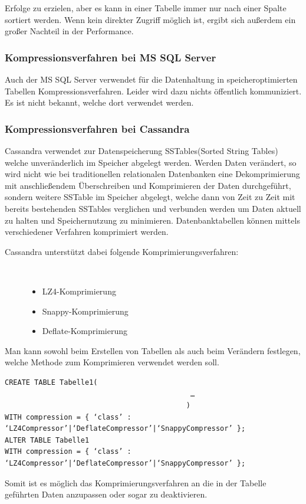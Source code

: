 \documentclass[a4paper, 12pt]{scrartcl}
\begin{document}
Erfolge zu erzielen, aber es kann in einer Tabelle immer nur nach einer Spalte sortiert werden. Wenn kein direkter Zugriff möglich ist, ergibt sich außerdem ein großer Nachteil in der Performance.
\newpage
\subsubsection{Kompressionsverfahren bei MS SQL Server}
Auch der MS SQL Server verwendet für die Datenhaltung in speicheroptimierten Tabellen Kompressionsverfahren. Leider wird dazu nichts öffentlich kommuniziert. Es ist nicht bekannt, welche dort verwendet werden. 
\subsubsection{Kompressionsverfahren bei Cassandra}
Cassandra verwendet zur Datenspeicherung SSTables(Sorted String Tables) welche unveränderlich im Speicher abgelegt werden. Werden Daten verändert, so wird nicht wie bei traditionellen relationalen Datenbanken eine Dekomprimierung mit anschließendem Überschreiben und Komprimieren der Daten durchgeführt, sondern weitere SSTable im Speicher abgelegt, welche dann von Zeit zu Zeit mit bereits bestehenden SSTables verglichen und verbunden werden um Daten aktuell zu halten und Speichernutzung zu minimieren.
Datenbanktabellen können mittels verschiedener Verfahren komprimiert werden. 
\begin{description}
	\item[Cassandra unterstützt dabei folgende Komprimierungsverfahren:]~\par
	\begin{itemize}
		\item LZ4-Komprimierung
		\item Snappy-Komprimierung
		\item Deflate-Komprimierung
	\end{itemize}
\end{description}
Man kann sowohl beim Erstellen von Tabellen als auch beim Verändern festlegen, welche Methode zum Komprimieren verwendet werden soll.
\begin{verbatim}
CREATE TABLE Tabelle1(
                                            …
                                           )
WITH compression = { ‘class’ : ‘LZ4Compressor’|‘DeflateCompressor’|‘SnappyCompressor’ };
ALTER TABLE Tabelle1
WITH compression = { ‘class’ : ‘LZ4Compressor’|‘DeflateCompressor’|‘SnappyCompressor’ };
\end{verbatim}
Somit ist es möglich das Komprimierungsverfahren an die in der Tabelle geführten Daten anzupassen oder sogar zu deaktivieren. 
\end{document}
